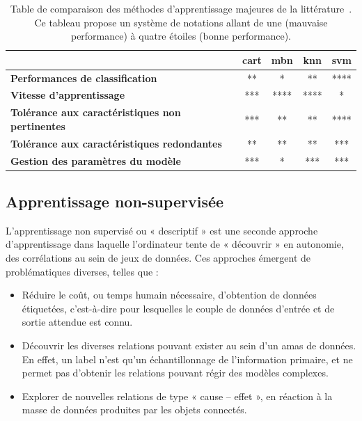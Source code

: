 \begin{table}[H]
  \small
  \centering 
\begin{tabular}{lcccc}
    \toprule
                                                                & \textbf{\gls{cart}}   & \textbf{\gls{mbn}}& \textbf{\gls{knn}}    & \textbf{\gls{svm}}\\
    \midrule
    \textbf{Performances de classification}                     & **                    & *                 & **                    & ****              \\
    \midrule
    \textbf{Vitesse d'apprentissage}                            & ***                   & ****              & ****                  & *                 \\
    \midrule
    \textbf{Tolérance aux caractéristiques non pertinentes}     & ***                   & **                & **                    & ****  \\
    \midrule
    \textbf{Tolérance aux caractéristiques redondantes}         & **                    & **                & **                    & ***               \\
    \midrule
    \textbf{Gestion des paramètres du modèle}                   & ***                   & *                 & ***                   & ***               \\
    \bottomrule
  \end{tabular}
  \caption{Table de comparaison des méthodes d'apprentissage majeures de la littérature~\cite{Kotsiantis2007}. Ce tableau propose un système de notations allant de une (mauvaise performance) à quatre étoiles (bonne performance).}
  \label{tab:model_comparison}
\end{table}

\subsection{Apprentissage non-supervisée}
L’apprentissage non supervisé ou « descriptif » est une seconde approche d’apprentissage dans laquelle l’ordinateur tente de « découvrir » en autonomie, des corrélations au sein de jeux de données. Ces approches émergent de problématiques diverses, telles que :
\begin{itemize}
    \item Réduire le coût, ou temps humain nécessaire, d’obtention de données étiquetées, c’est-à-dire pour lesquelles le couple de données d’entrée et de sortie attendue est connu.
    \item Découvrir les diverses relations pouvant exister au sein d’un amas de données. En effet, un label n’est qu’un échantillonnage de l’information primaire, et ne permet pas d’obtenir les relations pouvant régir des modèles complexes.
    \item Explorer de nouvelles relations de type « cause – effet », en réaction à la masse de données produites par les objets connectés. 
\end{itemize}\par

